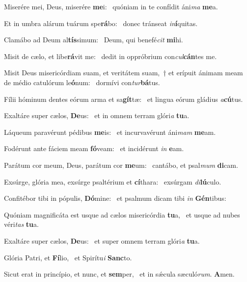 \item Miserére mei, Deus, miserére \textbf{me}i:~\psstar{} quóniam in te confídit áni\textit{ma} \textbf{me}a.
\item Et in umbra alárum tuárum spe\textbf{rá}bo:~\psstar{} donec tránseat \textit{in}\textbf{í}quitas.
\item Clamábo ad Deum al\textbf{tís}si\-mum:~\psstar{} Deum, qui benefé\textit{cit} \textbf{mi}hi.
\item Misit de cælo, et libe\textbf{rá}vit me:~\psstar{} dedit in oppróbrium con\textit{cul}\textbf{cán}tes me.
\item Misit Deus misericórdiam suam, et veritátem suam,~† et erípuit ánimam meam de médio catulórum le\textbf{ó}num:~\psstar{} dormívi con\textit{tur}\textbf{bá}tus.
\item Fílii hóminum dentes eórum arma et sa\textbf{gít}tæ:~\psstar{} et lingua eórum gládius \textit{a}\textbf{cú}tus.
\item Exaltáre super cælos, \textbf{De}us:~\psstar{} et in omnem terram glóri\textit{a} \textbf{tu}a.
\item Láqueum paravérunt pédibus \textbf{me}is:~\psstar{} et incurvavérunt áni\textit{mam} \textbf{me}am.
\item Fodérunt ante fáciem meam \textbf{fó}veam:~\psstar{} et incidérunt \textit{in} \textbf{e}am.
\item Parátum cor meum, Deus, parátum cor \textbf{me}um:~\psstar{} cantábo, et psal\textit{mum} \textbf{di}cam.
\item Exsúrge, glória mea, exsúrge psaltérium et \textbf{cí}thara:~\psstar{} exsúrgam \textit{di}\textbf{lú}culo.
\item Confitébor tibi in pópulis, \textbf{Dó}mine:~\psstar{} et psalmum dicam tibi \textit{in} \textbf{Gén}tibus:
\item Quóniam magnificáta est usque ad cælos misericórdia \textbf{tu}a,~\psstar{} et usque ad nubes véri\textit{tas} \textbf{tu}a.
\item Exaltáre super cælos, \textbf{De}us:~\psstar{} et super omnem terram glóri\textit{a} \textbf{tu}a.
\item Glória Patri, et \textbf{Fí}lio,~\psstar{} et Spirítu\textit{i} \textbf{Sanc}to.
\item Sicut erat in princípio, et nunc, et \textbf{sem}per,~\psstar{} et in sǽcula sæculó\textit{rum}. \textbf{A}men.